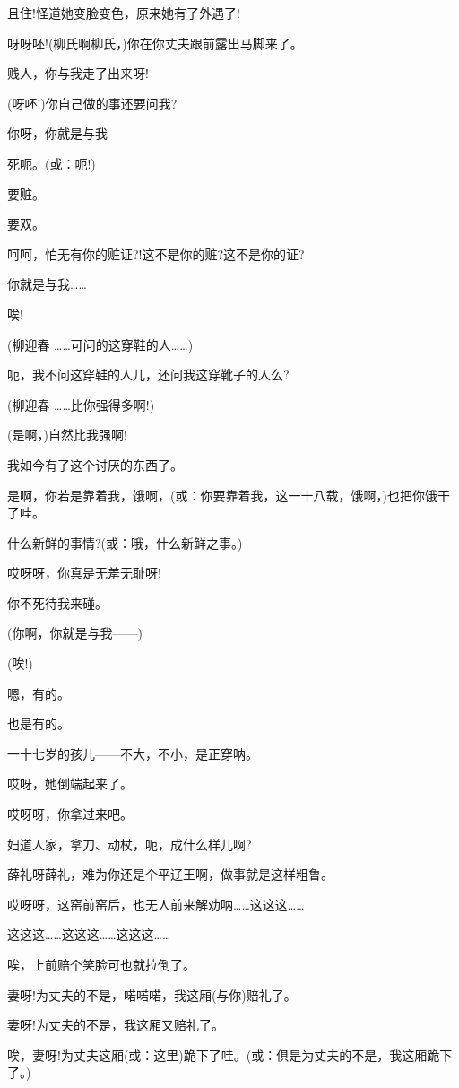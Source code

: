 且住!怪道她变脸变色，原来她有了外遇了!

呀呀呸!(柳氏啊柳氏，)你在你丈夫跟前露出马脚来了。

贱人，你与我走了出来呀!

(呀呸!)你自己做的事还要问我?

你呀，你就是与我------

死呃。(或：呃!)

要赃。

要双。

呵呵，怕无有你的赃证?!这不是你的赃?这不是你的证?

你就是与我\ldots{}\ldots{}

唉!

(柳迎春 \ldots{}\ldots{}可问的这穿鞋的人\ldots{}\ldots{})

呃，我不问这穿鞋的人儿，还问我这穿靴子的人么?

(柳迎春 \ldots{}\ldots{}比你强得多啊!)

(是啊，)自然比我强啊!

我如今有了这个讨厌的东西了。

是啊，你若是靠着我，饿啊，(或：你要靠着我，这一十八载，饿啊，)也把你饿干了哇。

什么新鲜的事情?(或：哦，什么新鲜之事。)

哎呀呀，你真是无羞无耻呀!

你不死待我来碰。

(你啊，你就是与我------)

(唉!)

嗯，有的。

也是有的。

一十七岁的孩儿------不大，不小，是正穿呐。

哎呀，她倒端起来了。

哎呀呀，你拿过来吧。

妇道人家，拿刀、动杖，呃，成什么样儿啊?

薛礼呀薛礼，难为你还是个平辽王啊，做事就是这样粗鲁。

哎呀呀，这窑前窑后，也无人前来解劝呐\ldots{}\ldots{}这这这\ldots{}\ldots{}

这这这\ldots{}\ldots{}这这这\ldots{}\ldots{}这这这\ldots{}\ldots{}

唉，上前赔个笑脸可也就拉倒了。

妻呀!为丈夫的不是，喏喏喏，我这厢(与你)赔礼了。

妻呀!为丈夫的不是，我这厢又赔礼了。

唉，妻呀!为丈夫这厢(或：这里)跪下了哇。(或：俱是为丈夫的不是，我这厢跪下了。)

